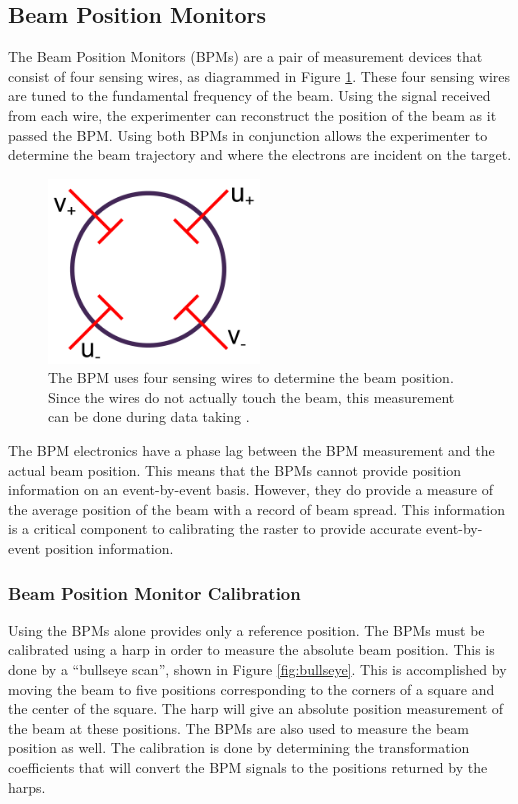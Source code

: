 \subsection{Beam Position Monitors}

The Beam Position Monitors (BPMs) are a pair of measurement devices that consist of four sensing wires, as diagrammed in Figure \ref{fig:bpm}. These four sensing wires are tuned to the fundamental frequency of the beam. Using the signal received from each wire, the experimenter can reconstruct the position of the beam as it passed the BPM. Using both BPMs in conjunction allows the experimenter to determine the beam trajectory and where the electrons are incident on the target.

\begin{figure}[h]
\begin{center}
	\includegraphics[width=0.5\textwidth]{./setup/fig/bpm.png}
	\caption{The BPM uses four sensing wires to determine the beam position. Since the wires do not actually touch the beam, this measurement can be done during data taking \cite{harp_schem}.}
	\label{fig:bpm}
\end{center}
\end{figure}

The BPM electronics have a phase lag between the BPM measurement and the actual beam position. This means that the BPMs cannot provide position information on an event-by-event basis. However, they do provide a measure of the average position of the beam with a record of beam spread. This information is a critical component to calibrating the raster to provide accurate event-by-event position information.

\subsubsection{Beam Position Monitor Calibration}

Using the BPMs alone provides only a reference position. The BPMs must be calibrated using a harp in order to measure the absolute beam position. This is done by a ``bullseye scan'', shown in Figure \ref{fig:bullseye}. This is accomplished by moving the beam to five positions corresponding to the corners of a square and the center of the square. The harp will give an absolute position measurement of the beam at these positions. The BPMs are also used to measure the beam position as well. The calibration is done by determining the transformation coefficients that will convert the BPM signals to the positions returned by the harps.

